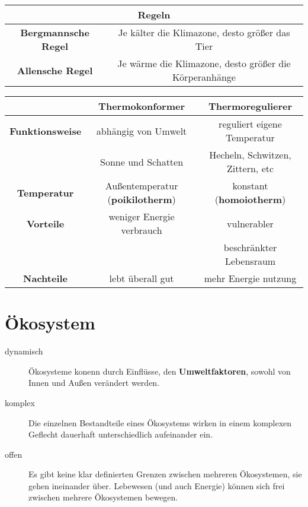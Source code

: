 \documentclass{article}
\begin{document}
\begin{center}
\begin{tabular}{ |c|c| } 
\hline
 \multicolumn{2}{|c|}{\textbf{Regeln}} \\ 
\hline
 \textbf{Bergmannsche Regel} & Je kälter die Klimazone, desto größer das Tier \\
\hline
 \textbf{Allensche Regel} & Je wärme die Klimazone, desto größer die Körperanhänge \\
\hline
\end{tabular}
\end{center}
 
\begin{center}
\begin{tabular}{ |c|c|c| }
\hline
 & \textbf{Thermokonformer} & \textbf{Thermoregulierer} \\
\hline
 \textbf{Funktionsweise} & abhängig von Umwelt & reguliert eigene Temperatur \\ 
 & Sonne und Schatten & Hecheln, Schwitzen, Zittern, etc \\
\hline
 \textbf{Temperatur} & Außentemperatur (\textbf{poikilotherm}) & konstant (\textbf{homoiotherm}) \\ 
\hline 
 \textbf{Vorteile} & weniger Energie verbrauch & vulnerabler \\
 &  & beschränkter Lebensraum \\
\hline
 \textbf{Nachteile} & lebt überall gut & mehr Energie nutzung \\
\hline
\end{tabular}
\end{center}
 
 
\section{Ökosystem}  
\begin{description} 
\item[dynamisch] Ökosysteme konenn durch Einflüsse, den \textbf{Umweltfaktoren}, sowohl von Innen und Außen verändert werden. 
\item[komplex] Die einzelnen Bestandteile eines Ökosystems wirken in einem komplexen Geflecht dauerhaft unterschiedlich aufeinander ein.
\item[offen] Es gibt keine klar definierten Grenzen zwischen mehreren Ökosystemen, sie gehen ineinander über. Lebewesen (und auch Energie) können sich frei zwischen mehrere Ökosystemen bewegen.
\end{description} 
 
\end{document}
